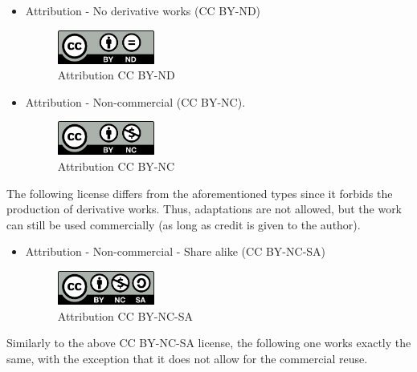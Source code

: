  \begin{itemize}
    \item Attribution - No derivative works (CC BY-ND)

    \begin{figure}[H]
    \centering
    \includegraphics[width=0.3\textwidth]{images/by-nd.png}
    \caption{Attribution CC BY-ND}
    \label{fig:ccBYND}
    \end{figure}


    \item Attribution - Non-commercial (CC BY-NC).

    \begin{figure}[H]
    \centering
    \includegraphics[width=0.3\textwidth]{images/by-nc.png}
    \caption{Attribution CC BY-NC}
    \label{fig:ccBYNC}
    \end{figure}
 \end{itemize}
 
The following license differs from the aforementioned types since it forbids the production of derivative works. Thus, adaptations are not allowed, but the work can still be used commercially (as long as credit is given to the author).

\begin{itemize} 
  \item Attribution - Non-commercial - Share alike (CC BY-NC-SA)

    \begin{figure}[H]
    \centering
    \includegraphics[width=0.3\textwidth]{images/by-nc-sa.png}
    \caption{Attribution CC BY-NC-SA}
    \label{fig:ccBYNCSA}
    \end{figure}
\end{itemize}

Similarly to the above CC BY-NC-SA license, the following one works exactly the same, with the exception that it does not allow for the commercial reuse.

